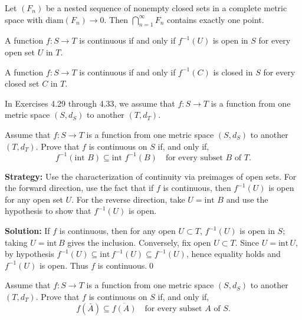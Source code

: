 \begin{theorem}
Let $(F_n)$ be a nested sequence of nonempty closed sets in a complete metric space with $\text{diam}(F_n) \to 0$. Then $\bigcap_{n=1}^{\infty} F_n$ contains exactly one point.
\end{theorem}

\begin{theorem}
A function $f: S \to T$ is continuous if and only if $f^{-1}(U)$ is open in $S$ for every open set $U$ in $T$.
\end{theorem}

\begin{theorem}
A function $f: S \to T$ is continuous if and only if $f^{-1}(C)$ is closed in $S$ for every closed set $C$ in $T$.
\end{theorem}

In Exercises 4.29 through 4.33, we assume that $f:S\to T$ is a function from one metric space $(S,d_S)$ to another $(T,d_T)$.



\begin{problembox}
Assume that $f : S \rightarrow T$ is a function from one metric space $(S, d_S)$ to another $(T, d_T)$. Prove that $f$ is continuous on $S$ if, and only if,
\[ f^{-1}(\text{int } B) \subseteq \text{int } f^{-1}(B) \quad \text{for every subset } B \text{ of } T. \]
\end{problembox}

\noindent\textbf{Strategy:} Use the characterization of continuity via preimages of open sets. For the forward direction, use the fact that if $f$ is continuous, then $f^{-1}(U)$ is open for any open set $U$. For the reverse direction, take $U = \text{int } B$ and use the hypothesis to show that $f^{-1}(U)$ is open.

\bigskip\noindent\textbf{Solution:}
If $f$ is continuous, then for any open $U\subset T$, $f^{-1}(U)$ is open in $S$; taking $U=\mathrm{int}\,B$ gives the inclusion. Conversely, fix open $U\subset T$. Since $U=\mathrm{int}\,U$, by hypothesis $f^{-1}(U)\subseteq\mathrm{int}\,f^{-1}(U)\subseteq f^{-1}(U)$, hence equality holds and $f^{-1}(U)$ is open. Thus $f$ is continuous.\qed



\begin{problembox}
Assume that $f : S \rightarrow T$ is a function from one metric space $(S, d_S)$ to another $(T, d_T)$. Prove that $f$ is continuous on $S$ if, and only if,
\[ f(\bar{A}) \subseteq \overline{f(A)} \quad \text{for every subset } A \text{ of } S. \]
\end{problembox}

